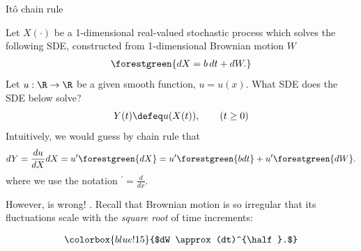 \documentclass[10pt]{beamer}
\begin{document}
\begin{frame}{It\^{o} chain rule} 

Let  $X(\cdot)$ be a 1-dimensional real-valued stochastic process which solves the following SDE, constructed from  1-dimensional Brownian motion $W$
%
\begin{align}
\forestgreen{dX = b \, dt + dW.}	
\label{eqn:SDE_with_one_dim_obs_and_brownian_motion}
\end{align}
\pause 
Let $u: \R \to \R$ be a given smooth function, $u=u(x)$.  What SDE does the SDE below solve?
\[ Y(t) \defeq u(X(t)), \qquad (t \geq 0) \]
\pause 
Intuitively, we would guess by chain rule that  
%
\begin{align}
dY = \frac{du}{dX}dX = u' \forestgreen{dX} = u' \forestgreen{b dt} + u' \forestgreen{dW}.
\label{eqn:intuitive_guess_at_sde_chain_rule}
\end{align}
where we use the notation ${}^\prime = \frac{d}{dx}$.
\pause 
%

However,  is wrong! \redx.   \pause Recall that Brownian motion is so irregular that its fluctuations scale with  the \textit{square root} of time increments:
%

\begin{align}
\colorbox{blue!15}{$dW \approx (dt)^{\half}.$}
\label{eqn:brownian_motion_fluctuates_with_the_square_root_of_increments_in_time}
\end{align}
\end{frame}
\end{document}
